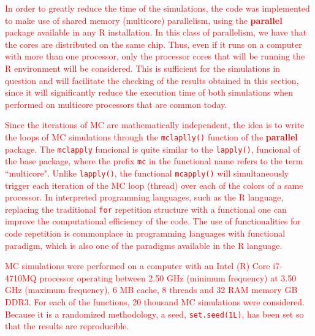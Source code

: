 \documentclass[10pt,letterpaper]{article}
\begin{document}
\textcolor{red}{In order to greatly reduce the time of the simulations, the code was implemented to make use of shared memory (multicore) parallelism, using the \textbf{parallel} package available in any \textsc{R} installation. In this class of parallelism, we have that the cores are distributed on the same chip. Thus, even if it runs on a computer with more than one processor, only the processor cores that will be running the \textsc{R} environment will be considered. This is sufficient for the simulations in question and will facilitate the checking of the results obtained in this section, since it will significantly reduce the execution time of both simulations when performed on multicore processors that are common today.}
  
\textcolor{red}{Since the iterations of MC are mathematically independent, the idea is to write the loops of MC simulations through the \texttt{mclaplly()} function of the \textbf{parallel} package. The \texttt{mclapply} funcional is quite similar to the \texttt{lapply()}, funcional of the base package, where the prefix \texttt{mc} in the functional name refers to the term ``multicore". Unlike \texttt{lapply()}, the functional \texttt{mcapply()} will simultaneously trigger each iteration of the MC loop (thread) over each of the colors of a same processor. In interpreted programming languages, such as the \textsc{R} language, replacing the traditional \texttt{for} repetition structure with a functional one can improve the computational efficiency of the code. The use of functionalities for code repetition is commonplace in programming languages with functional paradigm, which is also one of the paradigms available in the \textsc{R} language.}

\textcolor{red}{MC simulations were performed on a computer with an Intel (R) Core i7-4710MQ processor operating between 2.50 GHz (minimum frequency) at 3.50 GHz (maximum frequency), 6 MB cache, 8 threads and 32 RAM memory GB DDR3. For each of the functions, 20 thousand MC simulations were considered. Because it is a randomized methodology, a seed, \texttt{set.seed(1L)}, has been set so that the results are reproducible.} 
\end{document}
